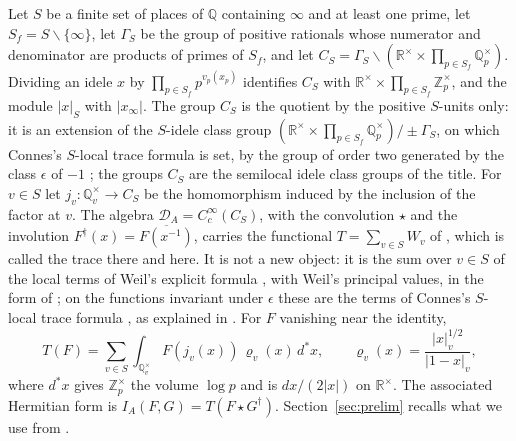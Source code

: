 \documentclass[11pt]{amsart}
\theoremstyle{definition}
\newcommand{\R}{\mathbb R}
\newcommand{\Z}{\mathbb Z}
\newcommand{\Q}{\mathbb Q}
\newcommand{\DA}{\mathcal D_A}
\begin{document}
Let $S$ be a finite set of places of $\Q$ containing $\infty$ and at least
one prime, let $S_f=S\smallsetminus\{\infty\}$, let $\Gamma_S$ be the group
of positive rationals whose numerator and denominator are products of primes
of $S_f$, and let
$C_S=\Gamma_S\backslash(\R^\times\times\prod_{p\in S_f}\Q_p^\times)$.
Dividing an idele $x$ by $\prod_{p\in S_f}p^{v_p(x_p)}$ identifies $C_S$ with
$\R^\times\times\prod_{p\in S_f}\Z_p^\times$, and the module $|x|_S$ with
$|x_\infty|$. The group $C_S$ is the quotient by the positive $S$-units only:
it is an extension of the $S$-idele class group
$(\R^\times\times\prod_{p\in S_f}\Q_p^\times)/\pm\Gamma_S$, on which Connes's
$S$-local trace formula \cite[Section~VII]{Connes99} is set, by the group of
order two generated by the class $\epsilon$ of $-1$
\cite[Section~2 and Lemma~2.5]{Companion}; the groups $C_S$ are the
semilocal idele class groups of the title. For $v\in S$ let $j_v:\Q_v^\times\to C_S$ be
the homomorphism induced by the inclusion of the factor at $v$. The algebra
$\DA=C_c^\infty(C_S)$, with the convolution $\star$ and the involution
$F^\dagger(x)=\overline{F(x^{-1})}$, carries the functional
$T=\sum_{v\in S}W_v$ of \cite{Companion}, which is called the trace there
and here. It is not a new object: it is the sum over $v\in S$ of the local
terms of Weil's explicit formula \cite{Weil1952}, with Weil's principal
values, in the form of \cite[Appendix~II]{Connes99}; on the functions
invariant under $\epsilon$ these are the terms of Connes's $S$-local trace
formula \cite[Theorem~4]{Connes99}, as explained in
\cite[Section~1]{Companion}. For $F$ vanishing near the identity,
\[
  T(F)=\sum_{v\in S}\int_{\Q_v^\times}F(j_v(x))\,\varrho_v(x)\,d^*x,\qquad
  \varrho_v(x)=\frac{|x|_v^{1/2}}{|1-x|_v},
\]
where $d^*x$ gives $\Z_p^\times$ the volume $\log p$ and is $dx/(2|x|)$ on
$\R^\times$. The associated Hermitian form is
$I_A(F,G)=T(F\star G^\dagger)$. Section~\ref{sec:prelim} recalls what we use
from \cite{Companion}.
\end{document}
